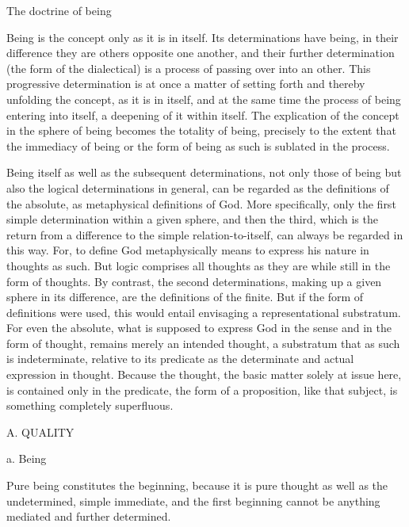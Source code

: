The doctrine of being

Being is the concept only as it is in itself.
Its determinations have being,
in their difference they are
others opposite one another,
and their further determination
(the form of the dialectical)
is a process of passing over into an other.
This progressive determination is
at once a matter of setting forth
and thereby unfolding the concept,
as it is in itself, and at the same time
the process of being entering into itself,
a deepening of it within itself.
The explication of the concept
in the sphere of being
becomes the totality of being,
precisely to the extent that
the immediacy of being
or the form of being as such
is sublated in the process.

Being itself as well as the subsequent determinations,
not only those of being but also
the logical determinations in general,
can be regarded as the definitions of the absolute,
as metaphysical definitions of God.
More specifically, only the first simple
determination within a given sphere,
and then the third,
which is the return from a difference
to the simple relation-to-itself,
can always be regarded in this way.
For, to define God metaphysically means
to express his nature in thoughts as such.
But logic comprises all thoughts as they are
while still in the form of thoughts.
By contrast, the second determinations,
making up a given sphere in its difference,
are the definitions of the finite.
But if the form of definitions were used,
this would entail envisaging a representational substratum.
For even the absolute, what is supposed
to express God in the sense and in the form of thought,
remains merely an intended thought,
a substratum that as such is indeterminate,
relative to its predicate as the determinate
and actual expression in thought.
Because the thought, the basic matter solely at issue here,
is contained only in the predicate,
the form of a proposition, like that subject,
is something completely superfluous.

A. QUALITY

a. Being

Pure being constitutes the beginning,
because it is pure thought as well as
the undetermined, simple immediate, and
the first beginning cannot be anything
mediated and further determined.

